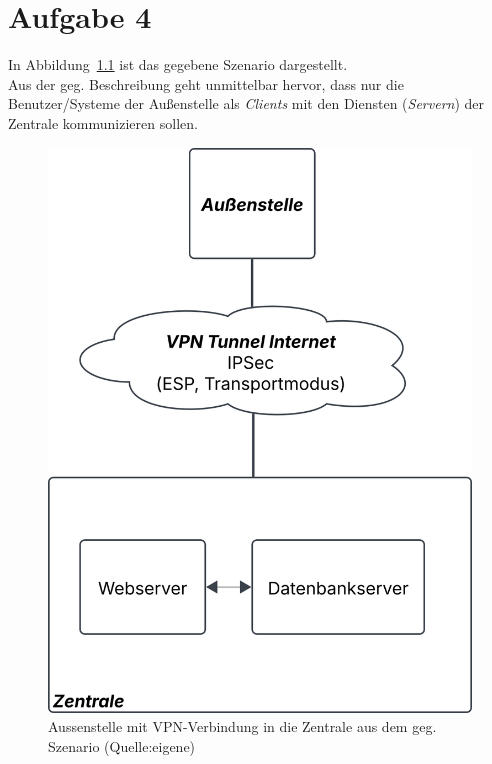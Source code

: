 \usepackage{lstmisc}\chapter{Aufgabe 4}


\noindent
In Abbildung~\ref{fig:aussenstelle} ist das gegebene Szenario dargestellt.\\
Aus der geg. Beschreibung geht unmittelbar hervor, dass nur die Benutzer/Systeme der Außenstelle als \textit{Clients} mit den Diensten (\textit{Servern}) der Zentrale kommunizieren sollen.\\

\begin{figure}
    \centering
    \includegraphics[scale=0.4]{aufgabe 4/img/aussenstelle.svg}
    \caption{Aussenstelle mit VPN-Verbindung in die Zentrale aus dem geg. Szenario (Quelle:eigene)}
    \label{fig:aussenstelle}
\end{figure}

